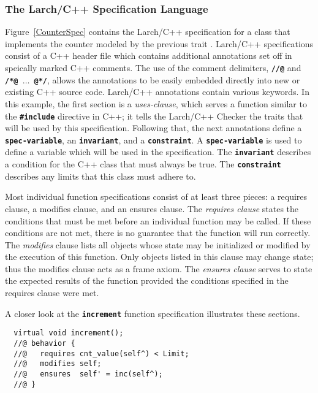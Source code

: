 \documentclass[12pt]{article} %
\newcommand{\reserved}[1]{\textbf{\texttt{#1}}} %
\begin{document}
\subsubsection{The Larch/C++ Specification Language}
\label{lcppbisl}
Figure~\ref{CounterSpec} contains the Larch/C++ specification
for a class that implements the counter modeled by the previous trait
\cite{Leavens96c}. Larch/C++ specifications consist of a C++ header
file which contains additional annotations set off in speically marked
C++ comments. The use of the comment delimiters, \reserved{//@} and
\reserved{/*@ $\dots$ @*/}, allows the annotations to be easily embedded
directly into new or existing C++ source code. Larch/C++ annotations contain various keywords. In this example, the first section is a
\emph{uses-clause}, which serves a function similar to the \reserved{\#include}
directive in C++; it tells the Larch/C++ Checker the traits that will
be used by this specification. Following that, the next annotations
define a \reserved{spec-variable}, an \reserved{invariant}, and a
\reserved{constraint}. A \reserved{spec-variable} is used to define a
variable which will be used in the specification. The
\reserved{invariant} describes a condition for the C++ class that must
always be true. The \reserved{constraint} describes any limits that
this class must adhere to. 

Most individual function specifications
consist of at least three pieces: a requires clause, a modifies
clause, and an ensures clause. The \emph{requires clause} states the
conditions that must be met before an individual function may be
called. If these conditions are not met, there is no guarantee that
the function will run correctly. The \emph{modifies} clause lists all
objects whose state may be initialized or modified by the execution of
this function. Only objects listed
in this clause may change state; thus the modifies clause acts as a
frame axiom. The \emph{ensures clause} serves to state the expected
results of the function provided the conditions specified in the
requires clause were met.

A closer look at the \reserved{increment} function specification illustrates
these sections.
 

\begin{verbatim}
  virtual void increment();
  //@ behavior {
  //@   requires cnt_value(self^) < Limit;
  //@   modifies self;
  //@   ensures  self' = inc(self^);
  //@ }
\end{verbatim}

\end{document}

